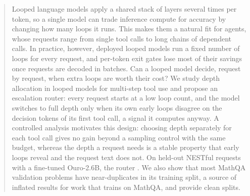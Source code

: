 \begin{abstract}
Looped language models apply a shared stack of layers several times per token, so a single
model can trade inference compute for accuracy by changing how many loops it runs. This makes
them a natural fit for agents, whose requests range from single tool calls to long chains of
dependent calls. In practice, however, deployed looped models run a fixed number of loops for
every request, and per-token exit gates lose most of their savings once requests are decoded in
batches. Can a looped model decide, request by request, when extra loops are worth their cost?
We study depth allocation in looped models for multi-step tool use and propose an escalation
router: every request starts at a low loop count, and the model switches to full depth only when
its own early loops disagree on the decision tokens of its first tool call, a signal it computes
anyway. A controlled analysis motivates this design: choosing depth separately for each tool call
gives no gain beyond a sampling control with the same budget, whereas the depth a request needs
is a stable property that early loops reveal and the request text does not. On held-out NESTful
requests with a fine-tuned Ouro-2.6B, the router . We also show that most MathQA validation problems have near-duplicates in its
training split, a source of inflated results for work that trains on MathQA, and provide clean
splits.
\end{abstract}
